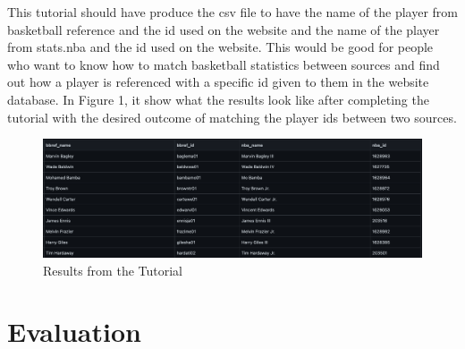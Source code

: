 \documentclass[10pt,twocolumn]{article}
\begin{document}
This tutorial should have produce the csv file to have the name of the player from basketball reference and the id used on the website and the name of the player from stats.nba and the id used on the website. This would be good for people who want to know how to match basketball statistics between sources and find out how a player is referenced with a specific id given to them in the website database. In Figure 1, it show what the results look like after completing the tutorial with the desired outcome of matching the player ids between two sources.

\begin{figure}
    \centering
    \includegraphics[width=.95\linewidth]{results.png}
    \caption{
       Results from the Tutorial
    }
    \label{fig:first-page}
\end{figure}
 
\section{Evaluation}
\end{document}
